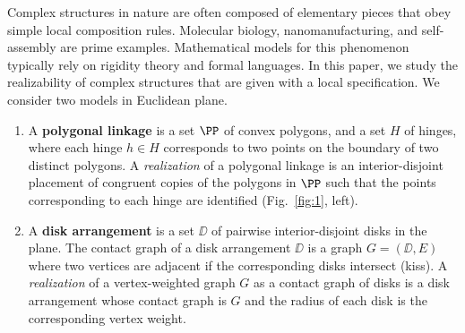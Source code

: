 Complex structures in nature are often composed of elementary pieces that obey simple local composition rules. Molecular biology, nanomanufacturing, and self-assembly are prime examples. Mathematical models for this phenomenon typically rely on rigidity theory and formal languages. In this paper, we study the realizability of complex structures that are given with a local specification. We consider two models in Euclidean plane.

\begin{enumerate}
\item A \textbf{polygonal linkage} is a set $\PP$ of convex polygons, and a set $H$ of hinges,
where each hinge $h\in H$ corresponds to two points on the boundary of two distinct polygons.
A \emph{realization} of a polygonal linkage is an interior-disjoint placement of congruent copies of the polygons in $\PP$ such that the points corresponding to each hinge are identified (Fig.~\ref{fig:1}, left).
\item A \textbf{disk arrangement} is a set $\DD$ of pairwise interior-disjoint disks in the plane. The contact graph of a disk arrangement $\DD$ is a graph $G=(\DD,E)$ where two vertices are adjacent if the corresponding disks intersect (kiss). A \emph{realization} of a vertex-weighted graph $G$ as a contact graph of disks is a disk arrangement whose contact graph is $G$ and the radius of each disk is the corresponding vertex weight.
\end{enumerate}
